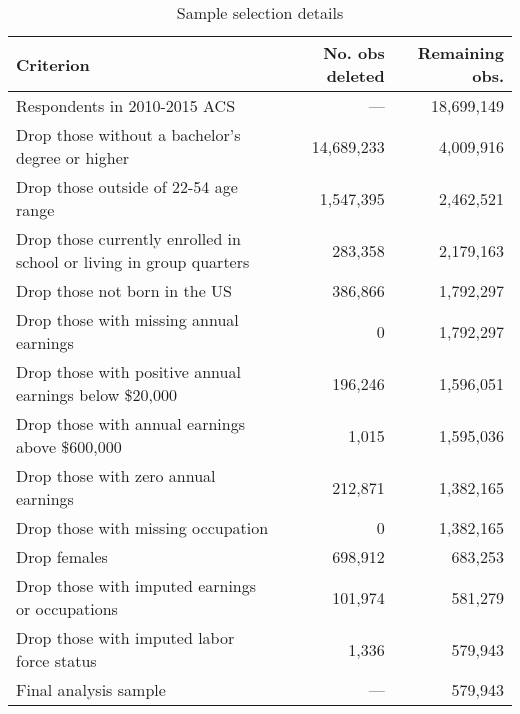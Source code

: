 \begin{table}[ht]
\caption{Sample selection details}
\label{tab:sampleselection}
\centering
\begin{threeparttable}
\begin{tabular}{lrr}
\toprule
Criterion                                                 & No. obs deleted  & Remaining obs.  \\
\midrule
Respondents in 2010-2015 ACS                              &      ---         & 18,699,149 \\ 
Drop those without a bachelor's degree or higher          & 14,689,233 & 4,009,916 \\ 
Drop those outside of 22-54 age range                     & 1,547,395 & 2,462,521 \\ 
Drop those currently enrolled in school or living in group quarters & 283,358 & 2,179,163 \\ 
Drop those not born in the US                             & 386,866 & 1,792,297 \\ 
Drop those with missing annual earnings                   & 0 & 1,792,297 \\ 
Drop those with positive annual earnings below \$20,000   & 196,246 & 1,596,051 \\ 
Drop those with annual earnings above \$600,000           & 1,015 & 1,595,036 \\ 
Drop those with zero annual earnings                      & 212,871 & 1,382,165 \\ 
Drop those with missing occupation                        & 0 & 1,382,165 \\ 
Drop females                                              & 698,912 & 683,253 \\ 
Drop those with imputed earnings or occupations           & 101,974 & 581,279 \\ 
Drop those with imputed labor force status                & 1,336 & 579,943 \\ 
\midrule
Final analysis sample                                     &      ---         &     579,943 \\ 
\bottomrule
\end{tabular}
\end{threeparttable}
\end{table}
